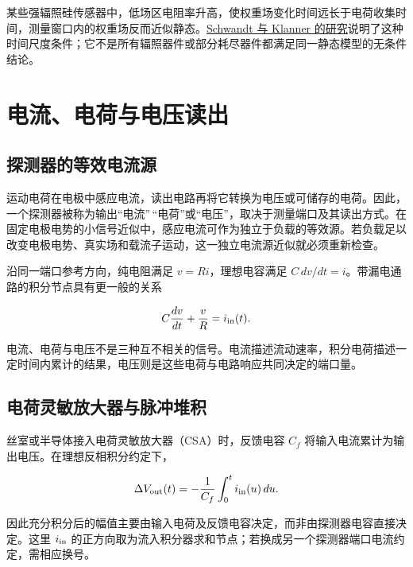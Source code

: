 \documentclass[
  11pt,
  a4paper,
  oneside,
  openany]{report}
\numberwithin{equation}{chapter}
\begin{document}
某些强辐照硅传感器中，低场区电阻率升高，使权重场变化时间远长于电荷收集时间，测量窗口内的权重场反而近似静态。\href{https://arxiv.org/abs/1905.08533}{Schwandt
与 Klanner
的研究}说明了这种时间尺度条件；它不是所有辐照器件或部分耗尽器件都满足同一静态模型的无条件结论。

\chapter{电流、电荷与电压读出}\label{ux7535ux6d41ux7535ux8377ux4e0eux7535ux538bux8bfbux51fa}

\section{探测器的等效电流源}\label{ux63a2ux6d4bux5668ux7684ux7b49ux6548ux7535ux6d41ux6e90}

运动电荷在电极中感应电流，读出电路再将它转换为电压或可储存的电荷。因此，一个探测器被称为输出``电流''\,``电荷''或``电压''，取决于测量端口及其读出方式。在固定电极电势的小信号近似中，感应电流可作为独立于负载的等效源。若负载足以改变电极电势、真实场和载流子运动，这一独立电流源近似就必须重新检查。

沿同一端口参考方向，纯电阻满足 \(v=Ri\)，理想电容满足
\(C\,dv/dt=i\)。带漏电通路的积分节点具有更一般的关系

\begin{equation}
C\frac{dv}{dt}+\frac{v}{R}=i_{\rm in}(t).
\end{equation}

电流、电荷与电压不是三种互不相关的信号。电流描述流动速率，积分电荷描述一定时间内累计的结果，电压则是这些电荷与电路响应共同决定的端口量。

\section{电荷灵敏放大器与脉冲堆积}\label{ux7535ux8377ux7075ux654fux653eux5927ux5668ux4e0eux8109ux51b2ux5806ux79ef}

丝室或半导体接入电荷灵敏放大器（CSA）时，反馈电容 \(C_f\)
将输入电流累计为输出电压。在理想反相积分约定下，

\begin{equation}
\Delta V_{\rm out}(t)=-\frac{1}{C_f}\int_0^t i_{\rm in}(u)\,du.
\end{equation}

因此充分积分后的幅值主要由输入电荷及反馈电容决定，而非由探测器电容直接决定。这里
\(i_{\rm in}\)
的正方向取为流入积分器求和节点；若换成另一个探测器端口电流约定，需相应换号。
\end{document}
